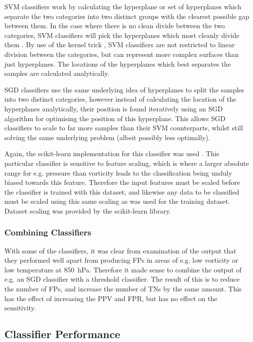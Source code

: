 \documentclass[pdftex,12pt,a4paper]{report}
\begin{document}
SVM classifiers work by calculating the hyperplane or set of hyperplanes which separate the two
categories into two distinct groups with the clearest possible gap between them. In the case where
there is no clean divide between the two categories, SVM classifiers will pick the hyperplanes which
most cleanly divide them \parencite{cortes1995support}. By use of the kernel trick
\parencite{aizerman1964theoretical}, SVM classifiers are not restricted to linear division between
the categories, but can represent more complex surfaces than just hyperplanes. The locations of the
hyperplanes which best separates the samples are calculated analytically.

SGD classifiers use the same underlying idea of hyperplanes to split the samples into two distinct
categories, however instead of calculating the location of the hyperplanes analytically, their
position is found iteratively using an SGD algorithm for optimising the position of this hyperplane.
This allows SGD classifiers to scale to far more samples than their SVM counterparts, whilst still
solving the same underlying problem (albeit possibly less optimally).

Again, the scikit-learn implementation for this classifier was used \parencite{scikitLearn2011}.
This particular classifier is sensitive to feature scaling, which is where a larger absolute range
for e.g. pressure than vorticity leads to the classification being unduly biased towards this
feature.  Therefore the input features must be scaled before the classifier is trained with this
dataset, and likewise any data to be classified must be scaled using this same scaling as was used
for the training dataset. Dataset scaling was provided by the scikit-learn library.

\subsubsection{Combining Classifiers}
With some of the classifiers, it was clear from examination of the output that they performed well
apart from producing FPs in areas of e.g. low vorticity or low temperature at \SI{850}{hPa}.
Therefore it made sense to combine the output of e.g. an SGD classifier with a threshold classifier.
The result of this is to reduce the number of FPs, and increase the number of TNs by the same
amount. This has the effect of increasing the PPV and FPR, but has no effect on the sensitivity.

\subsection{Classifier Performance}
\end{document}
